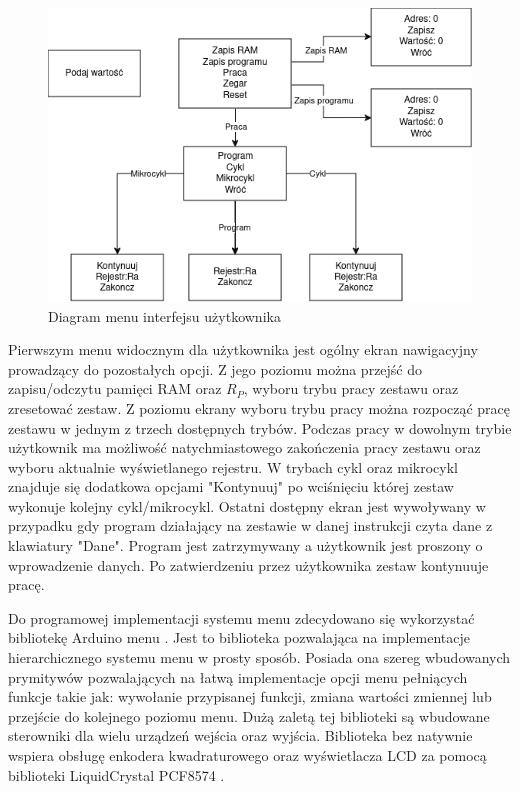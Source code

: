 \documentclass[../main.tex]{subfiles}
\begin{document}
    \begin{figure}[H]
        \centering
        \includegraphics[width=\linewidth]{menu_diagram.png}
        \caption{Diagram menu interfejsu użytkownika}
        \label{fig:menu_diagram}
    \end{figure}

    Pierwszym menu widocznym dla użytkownika jest ogólny ekran nawigacyjny prowadzący do pozostałych opcji. Z jego poziomu można przejść
    do zapisu/odczytu pamięci RAM oraz $R_P$, wyboru trybu pracy zestawu oraz zresetować zestaw. Z poziomu ekrany wyboru trybu pracy można 
    rozpocząć pracę zestawu w jednym z trzech dostępnych trybów. Podczas pracy w dowolnym trybie użytkownik ma możliwość natychmiastowego 
    zakończenia pracy zestawu oraz wyboru aktualnie wyświetlanego rejestru. W trybach cykl oraz mikrocykl znajduje się dodatkowa opcjami
    "Kontynuuj" po wciśnięciu której zestaw wykonuje kolejny cykl/mikrocykl. Ostatni dostępny ekran jest wywoływany w przypadku
    gdy program działający na zestawie w danej instrukcji czyta dane z klawiatury "Dane". Program jest zatrzymywany a użytkownik jest proszony
    o wprowadzenie danych. Po zatwierdzeniu przez użytkownika zestaw kontynuuje pracę.

    Do programowej implementacji systemu menu zdecydowano się wykorzystać bibliotekę Arduino menu \cite{arduino_menu}. Jest to biblioteka
    pozwalająca na implementacje hierarchicznego systemu menu w prosty sposób. Posiada ona szereg wbudowanych prymitywów pozwalających
    na łatwą implementacje opcji menu pełniących funkcje takie jak: wywołanie przypisanej funkcji, zmiana wartości zmiennej lub przejście
    do kolejnego poziomu menu. Dużą zaletą tej biblioteki są wbudowane sterowniki dla wielu urządzeń wejścia oraz wyjścia. Biblioteka 
    bez natywnie wspiera obsługę enkodera kwadraturowego oraz wyświetlacza LCD za pomocą biblioteki LiquidCrystal PCF8574 \cite{lcd_pcf8574}.
\end{document}
